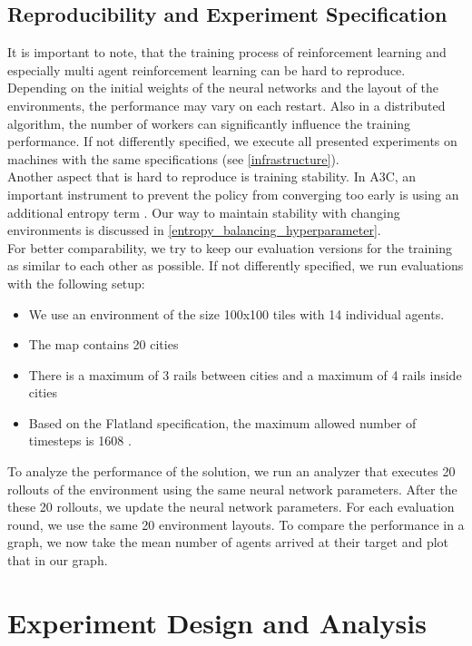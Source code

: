 \section[Reproducibility]{Reproducibility and Experiment Specification}\label{reproducability}
It is important to note, that the training process of reinforcement learning and especially multi agent reinforcement learning can be hard to reproduce. Depending on the initial weights of the neural networks and the layout of the environments, the performance may vary on each restart. Also in a distributed algorithm, the number of workers can significantly influence the training performance. If not differently specified, we execute all presented experiments on machines with the same specifications (see \autoref{infrastructure}).\\
Another aspect that is hard to reproduce is training stability. In A3C, an important instrument to prevent the policy from converging too early is using an additional entropy term \cite{a3c}. Our way to maintain stability with changing environments is discussed in \autoref{entropy_balancing_hyperparameter}.\\
For better comparability, we try to keep our evaluation versions for the training as similar to each other as possible. If not differently specified, we run evaluations with the following setup:
\begin{itemize}
	\item We use an environment of the size 100x100 tiles with 14 individual agents.
	\item The map contains 20 cities
	\item There is a maximum of 3 rails between cities and a maximum of 4 rails inside cities
	\item Based on the Flatland specification, the maximum allowed number of timesteps is 1608 \cite{flatland_spec}.
\end{itemize}
To analyze the performance of the solution, we run an analyzer that executes 20 rollouts of the environment using the same neural network parameters. After the these 20 rollouts, we update the neural network parameters. For each evaluation round, we use the same 20 environment layouts. 
To compare the performance in a graph, we now take the mean number of agents arrived at their target and plot that in our graph.
\chapter[Experiments]{Experiment Design and Analysis}\label{chap.experiment}
